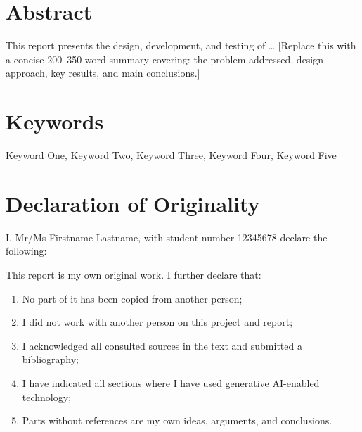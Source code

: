 \documentclass[12pt, a4paper]{report}
\newcommand{\studentname}{Mr/Ms Firstname Lastname}
\newcommand{\studentnumber}{12345678}
\begin{document}

\chapter*{Abstract}

This report presents the design, development, and testing of \ldots{}
[Replace this with a concise 200–350 word summary covering: the
problem addressed, design approach, key results, and main conclusions.]

\chapter*{Keywords}

Keyword One, Keyword Two, Keyword Three, Keyword Four, Keyword Five

\tableofcontents

\listoffigures
{}

\listoftables
{}

\chapter*{Declaration of Originality}

I, \studentname, with student number \studentnumber{} declare the following:

This report is my own original work. I further declare that:

\begin{enumerate}
    \item No part of it has been copied from another person;
    \item I did not work with another person on this project and report;
    \item I acknowledged all consulted sources in the text and submitted
          a bibliography;
    \item I have indicated all sections where I have used generative
          AI-enabled technology;
    \item Parts without references are my own ideas, arguments, and
          conclusions.
\end{enumerate}
\end{document}
